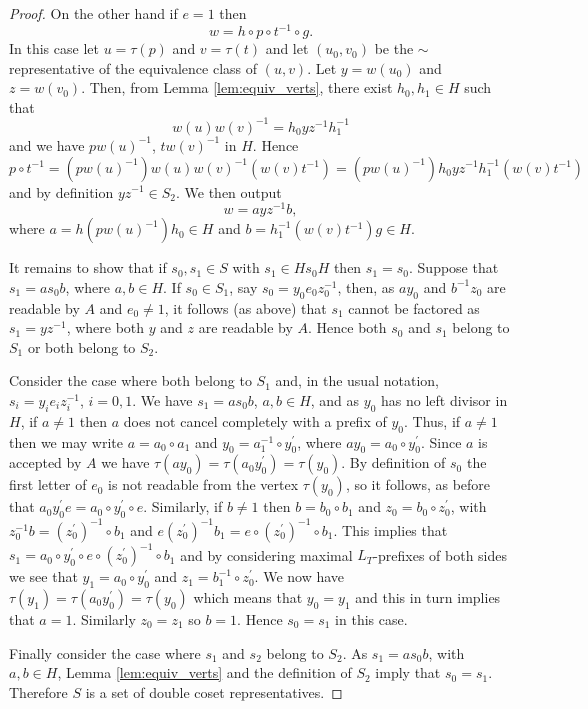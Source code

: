 \documentclass[a4paper,12pt]{article}
\def\t{\tau }
\numberwithin{equation}{section}
\numberwithin{figure}{section}
\begin{document}
\begin{proof}
On the other hand if $e=1$ then 
\[w=h\circ p\circ t^{-1}\circ g.\]
In this case let $u=\t(p)$ and $v=\t(t)$ and let $(u_0,v_0)$ be the $\sim$ representative
of the equivalence class of $(u,v)$.  Let $y=w(u_0)$ and $z=w(v_0)$. Then,  from Lemma
\ref{lem:equiv_verts}, there exist $h_0,h_1\in H$ such that 
\[w(u)w(v)^{-1}=h_0yz^{-1}h_1^{-1}\]
and we have $p w(u)^{-1}$, $t w(v)^{-1}$ in $H$. Hence 
\[
p\circ t^{-1}=( p w(u)^{-1})w(u)w(v)^{-1}( w(v)t^{-1})=( p w(u)^{-1}) h_0 yz^{-1}
h_1^{-1}( w(v)t^{-1})
\]
and by definition $yz^{-1}\in S_2$. We then output 
\[w=a yz^{-1} b,\]
where $a=h ( p w(u)^{-1}) h_0\in H$ and $b=h_1^{-1}( w(v)t^{-1})g \in H$.

It remains to show that if $s_0,s_1\in S$ with $s_1\in Hs_0H$ then $s_1=s_0$.
Suppose that $s_1=as_0b$, where $a, b\in H$.  
If $s_0\in S_1$, say $s_0=y_0e_0z_0^{-1}$, then, as $ay_0$ and $b^{-1}z_0$ are readable
by $A$ and $e_0\neq 1$, it follows (as above) that $s_1$  
cannot be factored as $s_1=yz^{-1}$,
where both $y$ and $z$ are readable by $A$. Hence both $s_0$ and $s_1$ belong to
$S_1$ or both belong to $S_2$. 

Consider the case where both belong to $S_1$ and, in the usual notation,
$s_i=y_i e_i z_i^{-1}$, $i=0,1$. We have $s_1=as_0b$, $a,b\in H$, and as $y_0$ has
no left divisor in $H$, if $a\neq 1$ then $a$ does not cancel completely with
 a prefix of $y_0$. Thus, if $a\neq 1$ then we may write $a=a_0\circ a_1$ and 
$y_0=a_1^{-1}\circ y_0^\prime$, where $ay_0=a_0\circ y_0^\prime$. Since 
$a$ is accepted by $A$ we have $\t(ay_0)=\t(a_0y_0^\prime)=\t(y_0)$. By definition
of $s_0$ the first letter of $e_0$ is not readable from the vertex $\t(y_0)$, so
it follows, as before that $a_0y_0^\prime e=a_0\circ y_0^\prime \circ e$. Similarly,
if $b\neq 1$ then $b=b_0\circ b_1$ and $z_0=b_0\circ z_0^\prime$, with
$z_0^{-1}b= (z_0^\prime)^{-1}\circ b_1$ and $e (z_0^\prime)^{-1}b_1=
e\circ  (z_0^\prime)^{-1}\circ b_1$. This implies that 
$s_1=a_0\circ y_0^\prime \circ  e\circ  (z_0^\prime)^{-1}\circ b_1$ and by considering 
maximal $L_T$-prefixes of both sides we see that $y_1=a_0\circ y_0^\prime$ and 
$z_1=b_1^{-1}\circ z_0^\prime$. We now have  $\t(y_1)=\t(a_0y_0^\prime)=\t(y_0)$ which
 means that 
$y_0=y_1$ and this in turn implies that $a=1$. Similarly $z_0=z_1$ so $b=1$. 
Hence $s_0=s_1$ in this case.

Finally consider the case where $s_1$ and $s_2$ belong to $S_2$. As $s_1=as_0b$, with
$a,b\in H$, Lemma \ref{lem:equiv_verts} and the definition of $S_2$ imply  that 
$s_0= s_1$. Therefore $S$ is a set of double coset representatives.
\end{proof}
\end{document}
